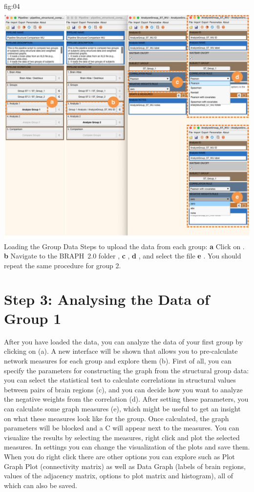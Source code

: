 \documentclass[justified]{tufte-handout}
\begin{document}
	{fig:04}
	{
	\includegraphics{fig04.jpg}
	}
	{Loading the Group Data}
	{
	Steps to upload the data from each group:
	{\bf a} Click on .
	{\bf b} Navigate to the BRAPH~2.0 folder , {\bf c} , {\bf d} , and select the file {\bf e} .
	}
You should repeat the same procedure for group 2.

\section{Step 3: Analysing the Data of Group 1}

After you have loaded the data, you can analyze the data of your first group by clicking on  (a). A new interface will be shown that allows you to pre-calculate network measures for each group and explore them (b). First of all, you can specify the parameters for constructing the graph from the structural group data: you can select the statistical test to calculate correlations in structural values between pairs of brain regions (c), and you can decide how you want to analyze the negative weights from the correlation (d). After setting these parameters, you can calculate some graph measures (e), which might be useful to get an insight on what these measures look like for the group. Once calculated, the graph parameters will be blocked and a C will appear next to the measures. You can visualize the results by selecting the measures, right click and plot the selected measures. In settings you can change the visualization of the plots and save them. When you do right click there are other options you can explore such as Plot Graph Plot (connectivity matrix) as well as Data Graph (labels of brain regions, values of the adjacency matrix, options to plot matrix and histogram), all of which can also be saved.
\end{document}
